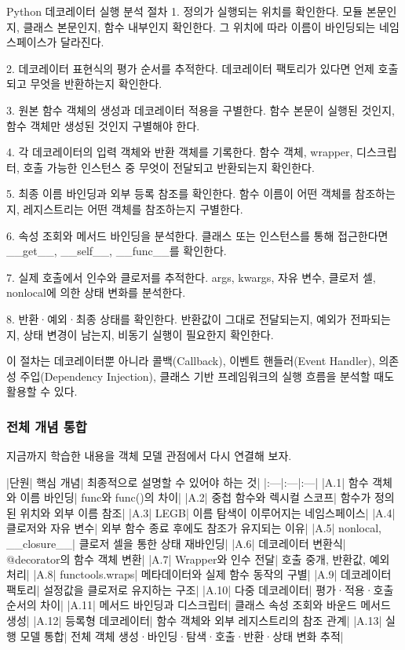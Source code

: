 \begin{dhksmry}
Python 데코레이터 실행 분석 절차
1. 정의가 실행되는 위치를 확인한다.
   모듈 본문인지, 클래스 본문인지, 함수 내부인지 확인한다. 
   그 위치에 따라 이름이 바인딩되는 네임스페이스가 달라진다.

2. 데코레이터 표현식의 평가 순서를 추적한다.
   데코레이터 팩토리가 있다면 언제 호출되고 무엇을 반환하는지 확인한다.

3. 원본 함수 객체의 생성과 데코레이터 적용을 구별한다.
   함수 본문이 실행된 것인지, 함수 객체만 생성된 것인지 구별해야 한다.

4. 각 데코레이터의 입력 객체와 반환 객체를 기록한다.
   함수 객체, wrapper, 디스크립터, 호출 가능한 인스턴스 중 무엇이 
   전달되고 반환되는지 확인한다.

5. 최종 이름 바인딩과 외부 등록 참조를 확인한다.
   함수 이름이 어떤 객체를 참조하는지, 레지스트리는 어떤 객체를 
   참조하는지 구별한다.

6. 속성 조회와 메서드 바인딩을 분석한다.
   클래스 또는 인스턴스를 통해 접근한다면 __get__, __self__, 
   __func__를 확인한다.

7. 실제 호출에서 인수와 클로저를 추적한다.
   args, kwargs, 자유 변수, 클로저 셀, nonlocal에 의한 
   상태 변화를 분석한다.

8. 반환·예외·최종 상태를 확인한다.
   반환값이 그대로 전달되는지, 예외가 전파되는지, 상태 변경이 남는지,
   비동기 실행이 필요한지 확인한다.
\end{dhksmry}

이 절차는 데코레이터뿐 아니라 콜백(Callback), 이벤트 핸들러(Event Handler), 의존성 주입(Dependency Injection), 클래스 기반 프레임워크의 실행 흐름을 분석할 때도 활용할 수 있다.

\subsubsection{전체 개념 통합}

지금까지 학습한 내용을 객체 모델 관점에서 다시 연결해 보자.

\begin{dhktable}
|단원|	핵심 개념|	최종적으로 설명할 수 있어야 하는 것|
|:---|:---|:---|
|A.1|	함수 객체와 이름 바인딩|	func와 func()의 차이|
|A.2|	중첩 함수와 렉시컬 스코프|	함수가 정의된 위치와 외부 이름 참조|
|A.3|	LEGB|	이름 탐색이 이루어지는 네임스페이스|
|A.4|	클로저와 자유 변수|	외부 함수 종료 후에도 참조가 유지되는 이유|
|A.5|	nonlocal, __closure__|	클로저 셀을 통한 상태 재바인딩|
|A.6|	데코레이터 변환식|	@decorator의 함수 객체 변환|
|A.7|	Wrapper와 인수 전달|	호출 중개, 반환값, 예외 처리|
|A.8|	functools.wraps|	메타데이터와 실제 함수 동작의 구별|
|A.9|	데코레이터 팩토리|	설정값을 클로저로 유지하는 구조|
|A.10|	다중 데코레이터|	평가·적용·호출 순서의 차이|
|A.11|	메서드 바인딩과 디스크립터|	클래스 속성 조회와 바운드 메서드 생성|
|A.12|	등록형 데코레이터|	함수 객체와 외부 레지스트리의 참조 관계|
|A.13|	실행 모델 통합|	전체 객체 생성·바인딩·탐색·호출·반환·상태 변화 추적|
\end{dhktable}

